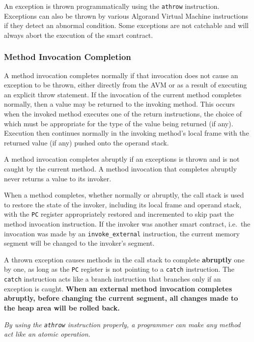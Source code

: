 \documentclass[11pt, A4]{report}
\begin{document}
    An exception is thrown programmatically using the \texttt{athrow} instruction. Exceptions can also be thrown by
    various Algorand Virtual Machine instructions if they detect an abnormal condition. Some exceptions are not
    catchable and will always abort the execution of the smart contract.

    \subsubsection{Method Invocation Completion}

    A method invocation completes normally if that invocation does not cause an exception to be thrown, either
    directly from the AVM or as a result of executing an explicit throw statement. If the invocation of the current
    method completes normally, then a value may be returned to the invoking method. This occurs when the invoked
    method executes one of the return instructions, the choice of which must be appropriate for the type of the value
    being returned (if any). Execution then continues normally in the invoking method's local frame with the returned
    value (if any) pushed onto the operand stack.

    A method invocation completes abruptly if an exceptions is thrown and is not caught by the current method. A
    method invocation that completes abruptly never returns a value to its invoker.

    When a method completes, whether normally or abruptly, the call stack is used to restore the state of the invoker,
    including its local frame and operand stack, with the \texttt{PC} register appropriately restored and incremented
    to skip past the method invocation instruction. If the invoker was another smart contract, i.e.\ the invocation
    was made by an \texttt{invoke\_external} instruction, the current memory segment will be changed to the invoker's
    segment.

    A thrown exception causes methods in the call stack to complete \textbf{abruptly} one by one, as long as the
    \texttt{PC} register is not pointing to a \texttt{catch} instruction. The \texttt{catch} instruction acts like a
    branch instruction that branches only if an exception is caught. \textbf{When an external method invocation
    completes abruptly, before changing the current segment, all changes made to the heap area will be rolled back.}

    \emph{By using the \texttt{athrow} instruction properly, a programmer can make any method act like an atomic
    operation.}
\end{document}
